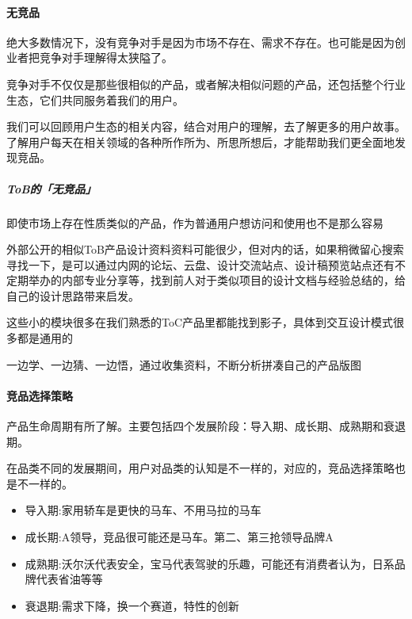 \documentclass[letterpaper,10pt,english]{sphinxmanual}
\begin{document}
\paragraph{无竞品}
\label{\detokenize{chapter_knowledge/goods_analysis:id19}}
绝大多数情况下，没有竞争对手是因为市场不存在、需求不存在。也可能是因为创业者把竞争对手理解得太狭隘了。

竞争对手不仅仅是那些很相似的产品，或者解决相似问题的产品，还包括整个行业生态，它们共同服务着我们的用户。

我们可以回顾用户生态的相关内容，结合对用户的理解，去了解更多的用户故事。了解用户每天在相关领域的各种所作所为、所思所想后，才能帮助我们更全面地发现竞品。


\subparagraph{ToB的「无竞品」}
\label{\detokenize{chapter_knowledge/goods_analysis:tob}}
即使市场上存在性质类似的产品，作为普通用户想访问和使用也不是那么容易

外部公开的相似ToB产品设计资料资料可能很少，但对内的话，如果稍微留心搜索寻找一下，是可以通过内网的论坛、云盘、设计交流站点、设计稿预览站点还有不定期举办的内部专业分享等，找到前人对于类似项目的设计文档与经验总结的，给自己的设计思路带来启发。

这些小的模块很多在我们熟悉的ToC产品里都能找到影子，具体到交互设计模式很多都是通用的

一边学、一边猜、一边悟，通过收集资料，不断分析拼凑自己的产品版图


\paragraph{竞品选择策略}
\label{\detokenize{chapter_knowledge/goods_analysis:id20}}
产品生命周期有所了解。主要包括四个发展阶段：导入期、成长期、成熟期和衰退期。

在品类不同的发展期间，用户对品类的认知是不一样的，对应的，竞品选择策略也是不一样的。
\begin{itemize}
\item {} 
导入期:家用轿车是更快的马车、不用马拉的马车

\item {} 
成长期:A领导，竞品很可能还是马车。第二、第三抢领导品牌A

\item {} 
成熟期:沃尔沃代表安全，宝马代表驾驶的乐趣，可能还有消费者认为，日系品牌代表省油等等

\item {} 
衰退期:需求下降，换一个赛道，特性的创新

\end{itemize}
\end{document}
